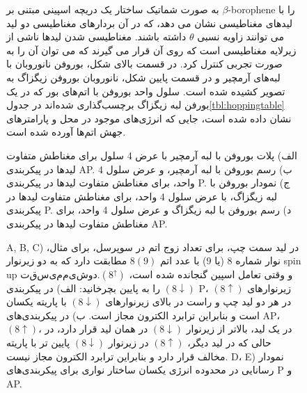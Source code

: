 \begin{figure}
\caption{به صورت شماتیک ساختار یک دریچه اسپینی مبتنی بر $\beta$-borophene را با لیدهای مغناطیسی نشان می دهد، که در آن بردارهای مغناطیسی دو لید می توانند زاویه نسبی $\theta$ داشته باشند. مغناطیسی شدن لیدها ناشی از زیرلایه مغناطیسی است که روی آن قرار می گیرند که می توان آن را به صورت تجربی کنترل کرد. در قسمت بالای شکل، بوروفن نانوروبان با لبه‌های آرمچیر و در قسمت پایین شکل، نانوروبان بوروفن زیگزاگ به تصویر کشیده شده است. سلول واحد بوروفن با اتم‌های بور که در یک بورفن لبه زیگزاگ برچسب‌گذاری شده‌اند در جدول\ref{tbl:hoppingtable} نشان داده شده است، جایی که انرژی‌های موجود در محل و پارامترهای جهش اتم‌ها آورده شده است.}
  \label{fig:model}
\end{figure}
    
\begin{figure}[!ht]
  \begin{latin}
  \centering
  \resizebox{0.45\textwidth}{!}{}
  \resizebox{0.45\textwidth}{!}{}
  \resizebox{0.45\textwidth}{!}{}
  \resizebox{0.45\textwidth}{!}{}  
  \end{latin}
\caption{الف) پلات بوروفن با لبه آرمچیر با عرض 4 سلول برای مغناطش متفاوت لیدها در پیکربندی AP. ب) رسم بوروفن با لبه آرمچیر، و عرض سلول 4 واحد، برای مغناطش متفاوت لیدها در پیکربندی P. ج) نمودار بوروفن با لبه زیگزاگ، با عرض سلول 4 واحد، برای مغناطش متفاوت لیدها در پیکربندی P. د) رسم بوروفن با لبه زیگزاگ و عرض سلول 4 واحد، برای مغناطش متفاوت لیدها در پیکربندی AP.}
\label{fig:conductance}
\end{figure}
\begin{figure}[!ht]
  \begin{latin}
    \centering
    \resizebox{0.32\textwidth}{!}{}
    \resizebox{0.32\textwidth}{!}{}
    \resizebox{0.32\textwidth}{!}{}
    \resizebox{0.45\textwidth}{!}{}
    \resizebox{0.45\textwidth}{!}{}
  \end{latin}
\caption{A, B, C) در لید سمت چپ، برای تعداد زوج اتم در سوپرسل، برای مثال، نوار شماره 8 (یا 9) با عدد اتم $8(9)$ مطابقت دارد که به دو زیر‌نوار spin up $ تقسیم می شود. (8^\uparrow)$ و وقتی تعامل اسپین گنجانده شده است، $(8\downarrow)$ را به پایین بچرخانید: الف) در پیکربندی P، زیر‌نوارهای $(8\uparrow)$ در هر دو لید چپ و راست در بالای زیر‌نوارهای $(8\downarrow)$ با پاریته یکسان است و بنابراین ترابرد الکترون مجاز است. ب) در پیکربندی‌های AP، $(8\uparrow)$، در یک لید، بالاتر از زیر‌نوار $(8\downarrow)$ در همان لید قرار دارد، در حالی که در لید دیگر، $(8\uparrow) $ در زیر‌نوار $(8\downarrow)$ پایین تر با پاریته مخالف قرار دارد و بنابراین ترابرد الکترون مجاز نیست. D، E) نمودار رسانایی در محدوده انرژی یکسان ساختار نواری برای پیکربندی‌های P و AP.}
\label{fig:bandconductance}
\end{figure}

